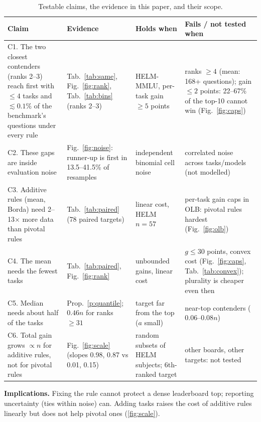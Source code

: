 \documentclass{article}
\theoremstyle{plain}
\theoremstyle{definition}
\theoremstyle{remark}
\begin{document}
\begin{table}[t]
\caption{Testable claims, the evidence in this paper, and their scope.}\label{tab:claims}
\centering\scriptsize\setlength{\tabcolsep}{3pt}
\begin{tabular}{@{}p{4.6cm}p{3.2cm}p{4.2cm}p{4.8cm}@{}}\toprule
Claim & Evidence & Holds when & Fails / not tested when\\\midrule
C1. The two closest contenders (ranks 2--3) reach first with $\le4$ tasks and $\lesssim0.1\%$ of the benchmark's questions under every rule & Tab.~\ref{tab:same}, Fig.~\ref{fig:rank}, Tab.~\ref{tab:bins} (ranks 2--3) & HELM-MMLU, per-task gain $\ge5$ points & ranks $\ge4$ (mean: 168+ questions); gain $\le2$ points: 22--67\% of the top-10 cannot win (Fig.~\ref{fig:caps})\\
C2. These gaps are inside evaluation noise & Fig.~\ref{fig:noise}: runner-up is first in 13.5--41.5\% of resamples & independent binomial cell noise & correlated noise across tasks/models (not modelled)\\
C3. Additive rules (mean, Borda) need 2--13$\times$ more data than pivotal rules & Tab.~\ref{tab:paired} (78 paired targets) & linear cost, HELM $n{=}57$ & per-task gain caps in OLB: pivotal rules hardest (Fig.~\ref{fig:olb})\\
C4. The mean needs the fewest tasks & Tab.~\ref{tab:paired}, Fig.~\ref{fig:rank} & unbounded gains, linear cost & $g\le30$ points, convex cost (Fig.~\ref{fig:caps}, Tab.~\ref{tab:convex}); plurality is cheaper even then\\
C5. Median needs about half of the tasks & Prop.~\ref{p:quantile}; $0.46n$ for ranks $\ge31$ & target far from the top ($a$ small) & near-top contenders ($0.06$--$0.08n$)\\
C6. Total gain grows $\propto n$ for additive rules, not for pivotal rules & Fig.~\ref{fig:scale} (slopes 0.98, 0.87 vs 0.01, 0.15) & random subsets of HELM subjects; 6th-ranked target & other boards, other targets: not tested\\
\bottomrule\end{tabular}
\end{table}
\textbf{Implications.} Fixing the rule cannot protect a dense leaderboard top; reporting uncertainty (ties within noise) can. Adding tasks raises the cost of additive rules linearly but does not help pivotal ones (\cref{fig:scale}).
\end{document}
